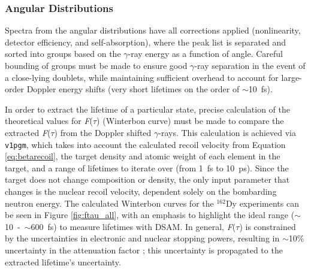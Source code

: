 \subsubsection{Angular Distributions}\label{sec:AD_Ft}
Spectra from the angular distributions have all corrections applied (nonlinearity, detector efficiency, and self-absorption), where the peak list is separated and sorted into groups based on the $\gamma$-ray energy as a function of angle. Careful bounding of groups must be made to ensure good $\gamma$-ray separation in the event of a close-lying doublets, while maintaining sufficient overhead to account for large-order Doppler energy shifts (very short lifetimes on the order of $\sim$10~fs). 

In order to extract the lifetime of a particular state, precise calculation of the theoretical values for \textit{F}(\textit{$\tau$}) (Winterbon curve) must be made to compare the extracted \textit{F}(\textit{$\tau$}) from the Doppler shifted $\gamma$-rays. This calculation is achieved via {\tt v1pgm}, which takes into account the calculated recoil velocity from Equation \ref{eq:betarecoil}, the target density and atomic weight of each element in the target, and a range of lifetimes to iterate over (from 1~fs to 10~ps). Since the target does not change composition or density, the only input parameter that changes is the nuclear recoil velocity, dependent solely on the bombarding neutron energy. The calculated Winterbon curves for the $^{162}$Dy experiments can be seen in Figure \ref{fig:ftau_all}, with an emphasis to highlight the ideal range ($\sim$10~-~$\sim$600~fs) to measure lifetimes with DSAM. In general, \textit{F}(\textit{$\tau$}) is constrained by the uncertainties in electronic and nuclear stopping powers, resulting in $\sim$10\% uncertainty in the attenuation factor \cite{Belgya_DSAM1996}; this uncertainty is propagated to the extracted lifetime's uncertainty.

